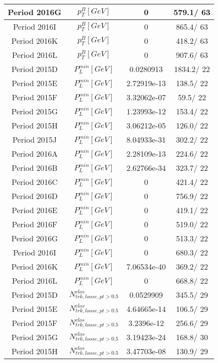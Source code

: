\documentclass{article}
\begin{document}
\begin{longtable}{c|c|c|c}
\hline
 Period 2016G & $p_{T}^{B} [GeV]$ & 0 & 579.1/ 63\\
\hline
 Period 2016I & $p_{T}^{B} [GeV]$ & 0 & 865.4/ 63\\
\hline
 Period 2016K & $p_{T}^{B} [GeV]$ & 0 & 418.2/ 63\\
\hline
 Period 2016L & $p_{T}^{B} [GeV]$ & 0 & 907.6/ 63\\
\hline
 Period 2015D & $P^{min}_{L} [GeV]$ & 0.0280913 & 1834.2/ 22\\
\hline
 Period 2015E & $P^{min}_{L} [GeV]$ & 2.72919e-13 & 138.5/ 22\\
\hline
 Period 2015F & $P^{min}_{L} [GeV]$ & 3.32062e-07 &  59.5/ 22\\
\hline
 Period 2015G & $P^{min}_{L} [GeV]$ & 1.23993e-12 & 153.4/ 22\\
\hline
 Period 2015H & $P^{min}_{L} [GeV]$ & 3.06212e-05 & 126.0/ 22\\
\hline
 Period 2015J & $P^{min}_{L} [GeV]$ & 8.04933e-31 & 302.2/ 22\\
\hline
 Period 2016A & $P^{min}_{L} [GeV]$ & 2.28109e-13 & 224.6/ 22\\
\hline
 Period 2016B & $P^{min}_{L} [GeV]$ & 2.62766e-34 & 323.7/ 22\\
\hline
 Period 2016C & $P^{min}_{L} [GeV]$ & 0 & 421.4/ 22\\
\hline
 Period 2016D & $P^{min}_{L} [GeV]$ & 0 & 756.9/ 22\\
\hline
 Period 2016E & $P^{min}_{L} [GeV]$ & 0 & 419.1/ 22\\
\hline
 Period 2016F & $P^{min}_{L} [GeV]$ & 0 & 519.0/ 22\\
\hline
 Period 2016G & $P^{min}_{L} [GeV]$ & 0 & 513.3/ 22\\
\hline
 Period 2016I & $P^{min}_{L} [GeV]$ & 0 & 680.3/ 22\\
\hline
 Period 2016K & $P^{min}_{L} [GeV]$ & 7.06534e-40 & 369.2/ 22\\
\hline
 Period 2016L & $P^{min}_{L} [GeV]$ & 0 & 668.8/ 22\\
\hline
 Period 2015D & $N^{clos}_{trk, loose, pt>0.5}$ & 0.0529909 & 345.5/ 29\\
\hline
 Period 2015E & $N^{clos}_{trk, loose, pt>0.5}$ & 4.64665e-14 & 106.5/ 29\\
\hline
 Period 2015F & $N^{clos}_{trk, loose, pt>0.5}$ & 3.2396e-12 & 256.6/ 29\\
\hline
 Period 2015G & $N^{clos}_{trk, loose, pt>0.5}$ & 3.19423e-24 & 168.8/ 30\\
\hline
 Period 2015H & $N^{clos}_{trk, loose, pt>0.5}$ & 3.47703e-08 & 130.9/ 29\\

\end{longtable}
\end{document}
